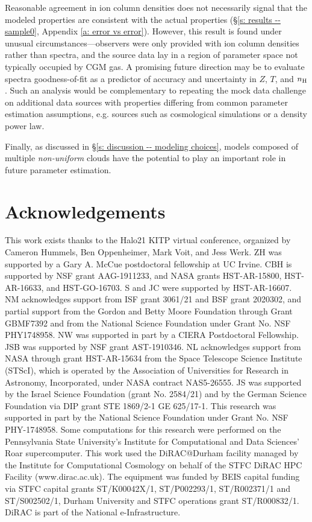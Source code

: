 \documentclass[fleqn,usenatbib]{mnras}
\begin{document}
Reasonable agreement in ion column densities does not necessarily signal that the modeled properties are consistent with the actual properties (\S\ref{s: results -- sample0}, Appendix \ref{a: error vs error}).
However, this result is found under unusual circumstances---observers were only provided with ion column densities rather than spectra, and the source data lay in a region of parameter space not typically occupied by CGM gas.
A promising future direction may be to evaluate spectra goodness-of-fit as a predictor of accuracy and uncertainty in $Z$, $T$, and $n_{\rm H}$.
Such an analysis would be complementary to repeating the mock data challenge on additional data sources with properties differing from common parameter estimation assumptions,
e.g. sources such as cosmological simulations or a density power law.

Finally, as discussed in \S\ref{s: discussion -- modeling choices}, models composed of multiple \textit{non-uniform} clouds have the potential to play an important role in future parameter estimation.

\section*{Acknowledgements}

This work exists thanks to the Halo21 KITP virtual conference, organized by Cameron Hummels, Ben Oppenheimer, Mark Voit, and Jess Werk.
ZH was supported by a Gary A. McCue postdoctoral fellowship at UC Irvine.
CBH is supported by NSF grant AAG-1911233, and NASA grants HST-AR-15800, HST-AR-16633, and HST-GO-16703.
S and JC were supported by HST-AR-16607.
NM acknowledges support from ISF grant 3061/21 and BSF grant 2020302, and partial support from the Gordon and Betty Moore Foundation through Grant GBMF7392 and from the National Science Foundation under Grant No. NSF PHY1748958. 
NW was supported in part by a CIERA Postdoctoral Fellowship.
JSB was supported by NSF grant AST-1910346.
NL acknowledges support from NASA through grant HST-AR-15634 from the Space Telescope Science Institute (STScI), which is operated by the Association of Universities for Research in Astronomy, Incorporated, under NASA contract NAS5-26555.
JS was supported by the Israel Science Foundation (grant No. 2584/21) and by the German Science Foundation via DIP grant STE 1869/2-1 GE 625/17-1. 
This research was supported in part by the National Science Foundation under Grant No. NSF PHY-1748958.
Some computations for this research were performed on the Pennsylvania State University's Institute for Computational and Data Sciences' Roar supercomputer.
This work used the DiRAC@Durham facility managed by the Institute for Computational Cosmology on behalf of the STFC DiRAC HPC Facility (www.dirac.ac.uk). The equipment was funded by BEIS capital funding via STFC capital grants ST/K00042X/1, ST/P002293/1, ST/R002371/1 and ST/S002502/1, Durham University and STFC operations grant ST/R000832/1.
DiRAC is part of the National e-Infrastructure.
\end{document}
